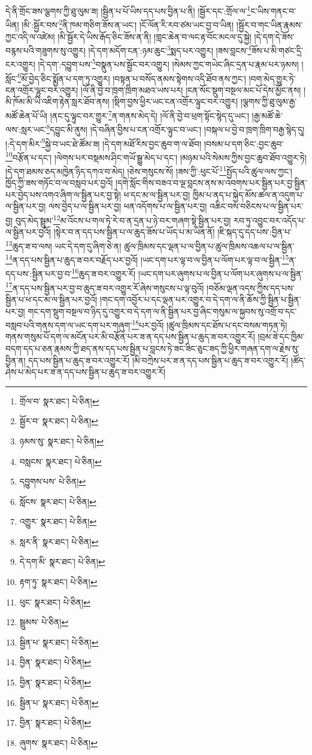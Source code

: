 དེ་ནི་གྲོང་ཟས་ལྕགས་ཀྱི་ཐུ་ལུམ་ཟ། །སྦྱིན་པ་པོ་ཡིས་དད་པས་བྱིན་པ་ནི། །སྦྱོར་དང་:གྲོལ་ལ་\footnote{གྲོལ་བ་  སྣར་ཐང་།  པེ་ཅིན། }ང་ཡིས་གནང་བ་ཡིན། །མི་:སྦྱོར་བས་\footnote{སྦྱོར་བ་  སྣར་ཐང་།  པེ་ཅིན། }ནི་ཁམ་གཅིག་ཟོས་ན་ཡང་། །ངོ་ལོན་རི་རབ་ཙམ་ཡང་བྱ་བ་ཡིན། །སྦྱོར་བ་གང་ཡིན་རྣམས་ཀྱང་འདི་ལ་འཛེམ། །མི་སྦྱོར་དེ་ཡིས་རྒོད་ཅིང་ཟོས་ན་ནི། །གླང་ཆེན་བ་ལང་རྟ་བོང་མངལ་དུ་སྐྱེ། །དེ་དག་དེ་ཟོས་བརྙས་པའི་གཟུགས་སུ་འགྱུར། །དེ་དག་མདོག་ངན་:ཉམ་ཆུང་\footnote{ཉམས་སུ་  སྣར་ཐང་།  པེ་ཅིན། }སྨད་པར་འགྱུར། །ཟས་བླངས་\footnote{བསླངས་  སྣར་ཐང་།  པེ་ཅིན། }ཟོས་པ་མི་གཙང་དྲི་ངར་འགྱུར། །དེ་དག་:དབྱུག་པས་\footnote{དབྱུགས་པས་  པེ་ཅིན། }བསྣུན་པས་སྦྱོང་བར་འགྱུར། །སེམས་ཀྱང་གཡེང་ཞིང་དྲན་པ་རྣམ་པར་ཉམས། །སློང་\footnote{སློངས་  སྣར་ཐང་།  པེ་ཅིན། }མོ་བྱེད་ཅིང་སྨྱོན་པ་དག་ཏུ་འགྱུར། །བསྟན་པ་བསོད་ནམས་སྟེགས་འདི་ཐོབ་ནས་ཀྱང་། །བག་མེད་གྱུར་ཏེ་ངན་འགྲོར་ལྷུང་བར་འགྱུར། །ལོ་ནི་བྱེ་བ་ཁྲག་ཁྲིག་མཐའ་ཡས་པར། །ངན་སོང་སྡུག་བསྔལ་མང་པོ་དེས་མྱོང་ནས། །མི་ཁོམ་མི་ཡི་འཇིག་རྟེན་སླར་ཐོབ་ནས། །སྡིག་བྱས་ཕྱིར་ཡང་ངན་འགྲོར་ལྟུང་བར་འགྱུར། །ལྕགས་ཀྱི་ཐུ་ལུམ་རྒྱ་མཚོ་ཆེན་པོ་ཡི། །ནང་དུ་ལྟུང་བར་གྱུར་\footnote{འགྱུར་  སྣར་ཐང་།  པེ་ཅིན། }ན་གནས་མེད་དེ། །ལོ་ནི་བྱེ་བ་ཕྲག་སྟོང་སྙེད་དུ་ཡང་། །རྒྱ་མཚོ་ཆེ་ལས་:སླར་ཡང་\footnote{སླར་ནི་  སྣར་ཐང་།  པེ་ཅིན། }དབྱུང་མི་ནུས། །དེ་བཞིན་བྱིས་པ་ངན་འགྲོར་ལྟུང་བ་ཡང་། །བསྐལ་པ་བྱེ་བ་ཁྲག་ཁྲིག་བརྒྱ་སྙེད་དུ། །:དེ་དག་མིར་\footnote{དེ་དག་མི་  སྣར་ཐང་།  པེ་ཅིན། }སྐྱེ་བ་ཡང་ཐེ་ཚོམ་ཟ། །དེ་དག་མཐོ་རིས་བྱང་ཆུབ་ག་ལ་ཐོབ། །བསམ་པ་དག་ཅིང་:བྱང་ཆུབ་\footnote{རྟག་ཏུ་  སྣར་ཐང་།  པེ་ཅིན། }བརྩོན་པ་དང་། །ལེགས་པར་བསྡམས་ཤིང་གཡོ་སྒྱུ་མེད་པ་དང་། །མཉམ་པའི་སེམས་ཀྱིས་བྱང་ཆུབ་ཐོབ་འགྱུར་ཏེ། །དེ་དག་ཐམས་ཅད་མཁྱེན་ཉིད་དཀའ་བ་མེད། །ཅེས་གསུངས་སོ། །ཟས་ཀྱི་:ཕུང་པོ་\footnote{ཕུང་  སྣར་ཐང་།  པེ་ཅིན། }སྤྱོད་པའི་ཚུལ་ལས་ཀྱང་། ཁྱོད་ཀྱི་ཟས་གཏོང་བ་ལ་བསླབ་པར་བྱའོ། །དགེ་སློང་གིས་བཟའ་བ་ལྔ་བླངས་ནས་མ་འབགས་པར་སྦྱིན་པར་བྱ་སྦྱིན་པར་བྱེད་པས་འགའ་ཞིག་ལ་སྦྱིན་པར་བྱ་སྟེ། ཕ་དང་མ་ལ་སྦྱིན་པར་བྱ། ཁྱིམ་པ་ནད་པ་སྐྱེད་མོས་ཚལ་ན་འདུག་པ་ལ་སྦྱིན་པར་བྱ། ལས་བྱེད་པ་ལ་སྦྱིན་པར་བྱ། ཕན་འདོགས་པ་ལ་སྦྱིན་པར་བྱ། འཆིང་བས་བཅིངས་པ་ལ་སྦྱིན་པར་བྱ། བུད་མེད་སྦྲུམ་\footnote{སྦྲུམས་  པེ་ཅིན། }མ་འོངས་པ་གལ་ཏེ་རེ་བ་ན་དྲན་པ་ཉེ་བར་གཞག་སྟེ་སྦྱིན་པར་བྱ། རབ་ཏུ་འབྱུང་བར་འདོད་པ་ལ་སྦྱིན་པར་བྱའོ། །སྟེར་བ་ན་དད་པས་སྦྱིན་པ་ལ་ཆུད་ཟོས་པ་ཡོད་པ་མ་ཡིན་ནོ། །ཇི་སྐད་དུ་དད་པས་:བྱིན་པ་\footnote{སྦྱིན་པ་  སྣར་ཐང་།  པེ་ཅིན། }ཆུད་ཟ་བ་ལས། ཡང་དེ་དག་དུ་ཞིག་ཅེ་ན། ཚུལ་ཁྲིམས་དང་ལྡན་པ་ལ་བྱིན་པ་ཚུལ་ཁྲིམས་འཆལ་པ་ལ་སྦྱིན་\footnote{བྱིན་  སྣར་ཐང་།  པེ་ཅིན། }ན་དད་པས་སྦྱིན་པ་ཆུད་ཟ་བར་བརྗོད་པར་བྱའོ། །ཡང་དག་པར་ལྟ་བ་ལ་བྱིན་པ་ལོག་པར་ལྟ་བ་ལ་སྦྱིན་\footnote{བྱིན་  སྣར་ཐང་།  པེ་ཅིན། }ན་དད་པས་:སྦྱིན་པར་བྱ་བ་\footnote{སྦྱིན་པ་  སྣར་ཐང་།  པེ་ཅིན། }ཆུད་ཟ་བར་འགྱུར་རོ། །ཡང་དག་པར་ཞུགས་པ་ལ་བྱིན་པ་ལོག་པར་ཞུགས་པ་ལ་སྦྱིན་\footnote{བྱིན་  སྣར་ཐང་།  པེ་ཅིན། }ན་དད་པས་སྦྱིན་པར་བྱ་བ་ཆུད་ཟ་བར་འགྱུར་རོ་ཞེས་གསུངས་པ་ལྟ་བུའོ། །བཅོམ་ལྡན་འདས་ཀྱིས་དད་པས་སྦྱིན་པ་ཕ་དང་མ་ལ་སྦྱིན་པར་བྱའོ། །གང་དག་འབྱོར་པ་དང་ལྡན་པར་འགྱུར་བ་དེ་དག་ལ་ནི་ཆོས་ཀྱི་སྦྱིན་པ་སྦྱིན་པར་བྱ། གང་དག་སྡུག་བསྔལ་བ་ཉིད་དུ་འགྱུར་བ་དེ་དག་ལ་ནི་སྦྱིན་པར་བྱ་ཞིང་གསུམ་ལ་སྐྱབས་སུ་འགྲོ་བ་དང་བསླབ་པའི་གནས་དག་ལ་ཡང་དག་པར་གཞུག་\footnote{ཞུགས་  སྣར་ཐང་།  པེ་ཅིན། }པར་བྱའོ། །ཚུལ་ཁྲིམས་དང་ཐོས་པ་དང་བསམ་གཏན་ཏེ། གནས་གསུམ་པོ་དག་ལ་མངོན་པར་མི་བརྩོན་པར་ཟ་ན་དད་པས་སྦྱིན་པ་ཆུད་ཟ་བར་འགྱུར་རོ། །བྲམ་ཟེ་དང་ཁྱིམ་བདག་དད་པ་ཅན་རྣམས་ཀྱི་ཐད་ནས་དད་པས་སྦྱིན་པ་བླངས་ཏེ་ཟང་ཟིང་ཅུང་ཟད་ཀྱི་ཕྱིར་གཞན་དག་ལ་རྗེས་སུ་བྱིན་ན། དད་པས་སྦྱིན་པ་ཆུད་ཟ་བར་འགྱུར་རོ། །མི་བཀྲེས་པར་ཟ་ན་དད་པས་སྦྱིན་པ་ཆུད་ཟ་བར་འགྱུར་རོ། །ཚོད་ཤེས་པ་མེད་པར་ཟ་ན་དད་པས་སྦྱིན་པ་ཆུད་ཟ་བར་འགྱུར་རོ། 